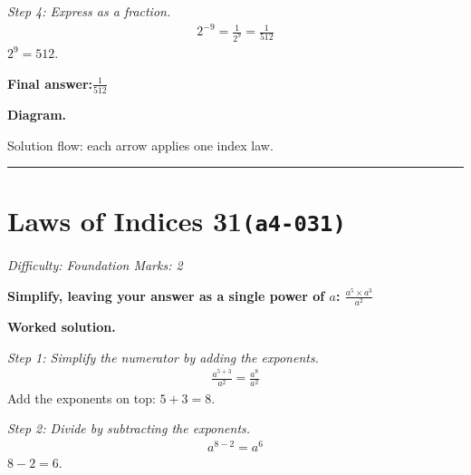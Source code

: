 \documentclass[11pt]{article}
\newcommand{\question}[1]{\par\medskip\noindent\textbf{#1}\par}
\begin{document}
\textit{Step 4: Express as a fraction.}
\[\begin{gathered}
2^{-9} = \frac{1}{2^9} = \frac{1}{512}
\end{gathered}\]
\( 2^9 = 512 \).

\begin{answerbox}
\textbf{Final answer:}\quad \(\displaystyle \frac{1}{512}\)
\end{answerbox}
\textbf{Diagram.}

\begin{center}
\end{center}
\small Solution flow: each arrow applies one index law.\normalsize

\medskip\hrule

\section*{Laws of Indices 31\quad\small\texttt{(a4-031)}}
\textit{Difficulty: Foundation \quad\textbar\quad Marks: 2}

\question{Simplify, leaving your answer as a single power of \( a \): \( \frac{a^5 \times a^3}{a^2} \)}

\textbf{Worked solution.}

\textit{Step 1: Simplify the numerator by adding the exponents.}
\[\begin{gathered}
\frac{a^{5+3}}{a^2} = \frac{a^8}{a^2}
\end{gathered}\]
Add the exponents on top: \( 5 + 3 = 8 \).

\textit{Step 2: Divide by subtracting the exponents.}
\[\begin{gathered}
a^{8-2} = a^6
\end{gathered}\]
\( 8 - 2 = 6 \).
\end{document}

